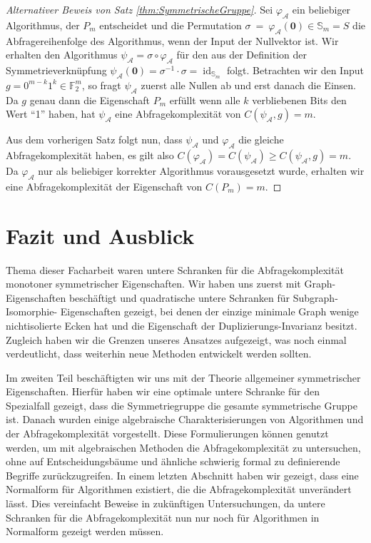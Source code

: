 \documentclass[10pt,a4paper, footheight=1mm, bibliography=totoc]{scrreprt}
\theoremstyle{definition}
\begin{document}
\begin{proof}
[Alternativer Beweis von Satz \ref{thm:SymmetrischeGruppe}]
Sei $\varphi_\mathcal{A}$ ein beliebiger Algorithmus,
der $P_m$ entscheidet und die Permutation
$\sigma~=~\varphi_\mathcal{A}(\boldsymbol{0})\in\mathbb{S}_m=S$
die Abfragereihenfolge des Algorithmus, wenn der Input
der Nullvektor ist. Wir erhalten den Algorithmus
$\psi_\mathcal{A} = \sigma \circ \varphi_\mathcal{A}$
für den aus der Definition der Symmetrieverknüpfung
$\psi_\mathcal{A}(\boldsymbol{0})
= \sigma^{-1} \cdot \sigma = \operatorname{id}_{\mathbb{S}_m}$ folgt.
Betrachten wir den Input $g=0^{m-k}1^k \in \mathbb{F}_2^m$,
so fragt $\psi_\mathcal{A}$ zuerst alle Nullen ab und
erst danach die Einsen. Da $g$ genau dann die Eigenschaft
$P_m$ erfüllt wenn alle $k$ verbliebenen Bits den Wert
"`1"' haben, hat $\psi_\mathcal{A}$ eine Abfragekomplexität
von $C(\psi_\mathcal{A}, g) = m$.

Aus dem vorherigen Satz folgt nun, dass 
$\psi_\mathcal{A}$ und $\varphi_\mathcal{A}$ die gleiche
Abfragekomplexität haben, es gilt also
$C(\varphi_\mathcal{A}) = C(\psi_\mathcal{A}) 
\geq C(\psi_\mathcal{A},g) = m$.
Da $\varphi_\mathcal{A}$ nur als beliebiger korrekter Algorithmus
vorausgesetzt wurde, erhalten wir eine Abfragekomplexität der Eigenschaft
von $C(P_m)=m$.
\end{proof}


\chapter{Fazit und Ausblick}
Thema dieser Facharbeit waren untere Schranken für die
Abfragekomplexität monotoner symmetrischer Eigenschaften.
Wir haben uns zuerst mit Graph-Eigenschaften beschäftigt 
und quadratische untere Schranken für Subgraph-Isomorphie-
Eigenschaften gezeigt, bei denen der einzige minimale
Graph wenige nichtisolierte Ecken hat und die
Eigenschaft der Duplizierungs-Invarianz besitzt.
Zugleich haben wir die Grenzen unseres Ansatzes
aufgezeigt, was noch einmal verdeutlicht, dass 
weiterhin neue Methoden entwickelt werden sollten.

Im zweiten Teil beschäftigten wir uns mit der
Theorie allgemeiner symmetrischer Eigenschaften.
Hierfür haben wir eine optimale untere Schranke für
den Spezialfall gezeigt, dass die Symmetriegruppe die gesamte
symmetrische Gruppe ist. Danach wurden
einige algebraische Charakterisierungen von Algorithmen
und der Abfragekomplexität vorgestellt. Diese Formulierungen
können genutzt werden, um mit algebraischen Methoden
die Abfragekomplexität zu untersuchen, ohne auf 
Entscheidungsbäume und ähnliche schwierig formal zu 
definierende Begriffe zurückzugreifen. In einem letzten
Abschnitt haben wir gezeigt, dass eine Normalform
für Algorithmen existiert, die die Abfragekomplexität
unverändert lässt. Dies vereinfacht Beweise
in zukünftigen Untersuchungen, da untere Schranken
für die Abfragekomplexität nun nur noch für Algorithmen
in Normalform gezeigt werden müssen.
\\
\end{document}
